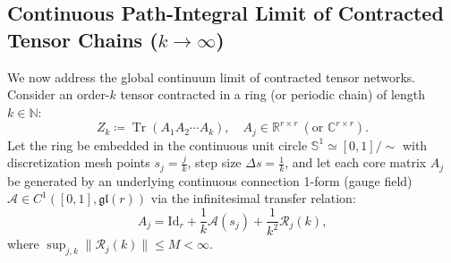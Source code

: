 \documentclass[11pt,a4paper,reqno]{amsart}
\theoremstyle{definition}
\numberwithin{equation}{section}
\providecommand{\R}{\mathbb{R}}
\newcommand{\C}{\mathbb{C}}
\newcommand{\N}{\mathbb{N}}
\providecommand{\Sph}{\mathbb{S}}
\newcommand{\Id}{\mathrm{Id}}
\newcommand{\Tr}{\operatorname{Tr}}
\providecommand{\Sph}{\mathbb{S}}
\providecommand{\R}{\mathbb{R}}
\begin{document}
\subsection{Continuous Path-Integral Limit of Contracted Tensor Chains (\texorpdfstring{$k \to \infty$}{k -> infty})}
\label{subsec:path_integral_gauge}
We now address the global continuum limit of contracted tensor networks. Consider an order-$k$ tensor contracted in a ring (or periodic chain) of length $k \in \N$:
\begin{equation}
    \label{eq:discrete_mps_trace}
    Z_k \coloneqq \Tr\left( A_1 A_2 \cdots A_k \right), \quad A_j \in \R^{r \times r} \ (\text{or } \C^{r \times r}).
\end{equation}
Let the ring be embedded in the continuous unit circle $\Sph^1 \simeq [0, 1]/\sim$ with discretization mesh points $s_j = \frac{j}{k}$, step size $\Delta s = \frac{1}{k}$, and let each core matrix $A_j$ be generated by an underlying continuous connection 1-form (gauge field) $\mathcal{A} \in C^1([0, 1], \mathfrak{gl}(r))$ via the infinitesimal transfer relation:
\begin{equation}
    \label{eq:transfer_generator}
    A_j = \Id_r + \frac{1}{k} \mathcal{A}(s_j) + \frac{1}{k^2} \mathcal{R}_j(k),
\end{equation}
where $\sup_{j, k} \|\mathcal{R}_j(k)\| \le M < \infty$.
\end{document}

